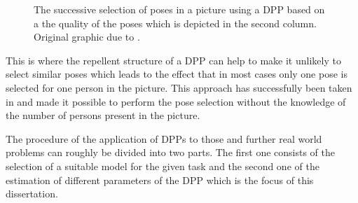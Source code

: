 \begin{enumerate}
\begin{figure}[h!]
	\caption{The successive selection of poses in a picture using a DPP based on a the quality of the poses which is depicted in the second column. Original graphic due to \cite{kulesza2010structured}.}
	\label{fig:1}
\end{figure}
 This is where the repellent structure of a DPP can help to make it unlikely to select similar poses which leads to the effect that in most cases only one pose is selected for one person in the picture. This approach has successfully been taken in \cite{kulesza2010structured} and made it possible to perform the pose selection without the knowledge of the number of persons present in the picture.
\end{enumerate}

The procedure of the application of DPPs to those and further real world problems can roughly be divided into two parts. The first one consists of the selection of a suitable model for the given task and the second one of the estimation of 
different parameters of the DPP which is the focus of this dissertation. %

